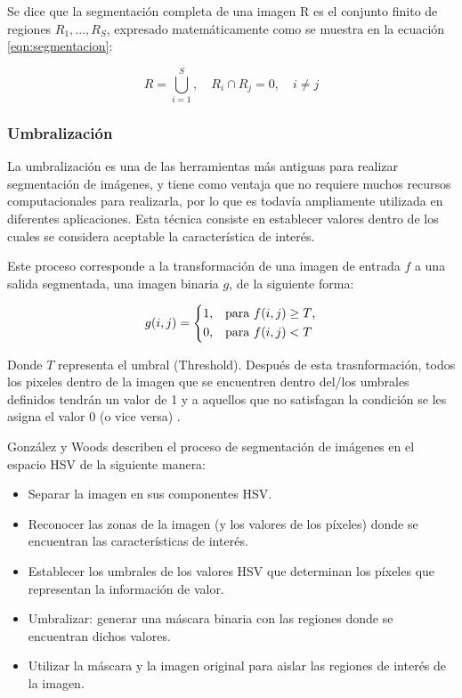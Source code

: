 Se dice que la segmentación completa de una imagen R es el conjunto finito de regiones $R_{1}, ..., R_{S}$, expresado matemáticamente como se muestra en la ecuación \ref{eqn:segmentacion}: 

\begin{equation}
R = \bigcup^{S}_{i = 1}, \quad
R_{i} \cap R_{j} = 0, \quad
i \neq j
\label{eqn:segmentacion}
\end{equation}

\subsubsection{Umbralización}
La umbralización es una de las herramientas más antiguas para realizar segmentación de imágenes, y tiene como ventaja que no requiere muchos recursos computacionales para realizarla, por lo que es todavía ampliamente utilizada en diferentes aplicaciones. Esta técnica consiste en establecer valores dentro de los cuales se considera aceptable la característica de interés.

Este proceso corresponde a la transformación de una imagen de entrada $f$ a una salida segmentada, una imagen binaria $g$, de la siguiente forma:

\begin{equation}
    g(i,j) =\begin{cases*}
        1, & para $f(i,j) \geq T$,\\
        0, & para $f(i,j) < T$ \end{cases*}    
    \label{eqn:segmented_bin}
\end{equation}

Donde $T$ representa el umbral (Threshold). Después de esta trasnformación, todos los pixeles dentro de la imagen que se encuentren dentro del/los umbrales definidos tendrán un valor de 1 y a aquellos que no satisfagan la condición se les asigna el valor 0 (o vice versa) \cite{sonka_image_2008}. \phantom{saltodelinea}



González y Woods \cite{gonzalez_digital_2002} describen el proceso de segmentación de imágenes en el espacio HSV de la siguiente manera:
\begin{itemize}
    \item Separar la imagen en sus componentes HSV.
    \item Reconocer las zonas de la imagen (y los valores de los píxeles) donde se encuentran las características de interés.
    \item Establecer los umbrales de los valores HSV que determinan los píxeles que representan la información de valor.
    \item Umbralizar: generar una máscara binaria con las regiones donde se encuentran dichos valores.
    \item Utilizar la máscara y la imagen original para aislar las regiones de interés de la imagen.
\end{itemize}


